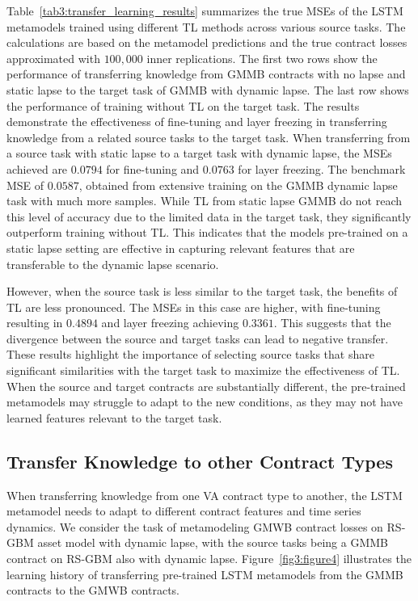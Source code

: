 Table~\ref{tab3:transfer_learning_results} summarizes the true MSEs of the LSTM metamodels trained using different TL methods across various source tasks.
The calculations are based on the metamodel predictions and the true contract losses approximated with $100,\!000$ inner replications.
The first two rows show the performance of transferring knowledge from GMMB contracts with no lapse and static lapse to the target task of GMMB with dynamic lapse.
The last row shows the performance of training without TL on the target task.
The results demonstrate the effectiveness of fine-tuning and layer freezing in transferring knowledge from a related source tasks to the target task. 
When transferring from a source task with static lapse to a target task with dynamic lapse, the MSEs achieved are $0.0794$ for fine-tuning and $0.0763$ for layer freezing.
The benchmark MSE of $0.0587$, obtained from extensive training on the GMMB dynamic lapse task with much more samples.
While TL from static lapse GMMB do not reach this level of accuracy due to the limited data in the target task, they significantly outperform training without TL. 
This indicates that the models pre-trained on a static lapse setting are effective in capturing relevant features that are transferable to the dynamic lapse scenario.

However, when the source task is less similar to the target task, the benefits of TL are less pronounced. The MSEs in this case are higher, with fine-tuning resulting in $0.4894$ and layer freezing achieving $0.3361$. 
This suggests that the divergence between the source and target tasks can lead to negative transfer.
These results highlight the importance of selecting source tasks that share significant similarities with the target task to maximize the effectiveness of TL. 
When the source and target contracts are substantially different, the pre-trained metamodels may struggle to adapt to the new conditions, as they may not have learned features relevant to the target task.

\subsection{Transfer Knowledge to other Contract Types}

When transferring knowledge from one VA contract type to another, the LSTM metamodel needs to adapt to different contract features and time series dynamics.
We consider the task of metamodeling GMWB contract losses on RS-GBM asset model with dynamic lapse, with the source tasks being a GMMB contract on RS-GBM also with dynamic lapse.
Figure~\ref{fig3:figure4} illustrates the learning history of transferring pre-trained LSTM metamodels from the GMMB contracts to the GMWB contracts.

